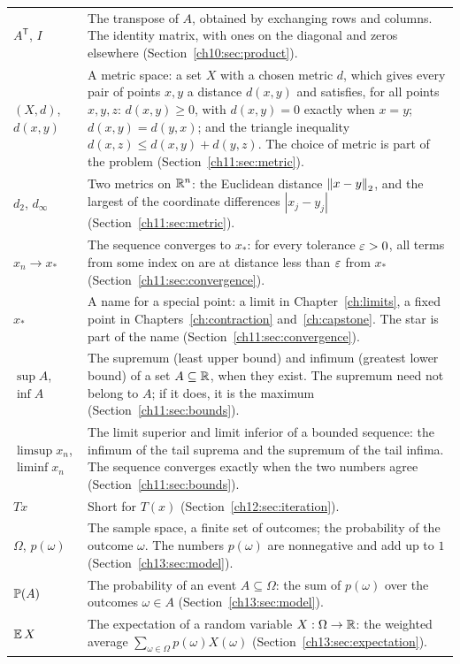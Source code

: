 \begin{longtable}{@{}p{1.25in}p{3.95in}@{}}
$A^{\mathsf T}$, $I$ & The transpose of $A$, obtained by exchanging rows and columns. The identity matrix, with ones on the diagonal and zeros elsewhere (Section~\ref{ch10:sec:product}).\\
$(X,d)$, $d(x,y)$ & A metric space: a set $X$ with a chosen metric $d$, which gives every pair of points $x,y$ a distance $d(x,y)$ and satisfies, for all points $x,y,z$: $d(x,y)\ge0$, with $d(x,y)=0$ exactly when $x=y$; $d(x,y)=d(y,x)$; and the triangle inequality $d(x,z)\le d(x,y)+d(y,z)$. The choice of metric is part of the problem (Section~\ref{ch11:sec:metric}).\\
$d_2$, $d_\infty$ & Two metrics on $\mathbb R^n$: the Euclidean distance $\left\|x-y\right\|_2$, and the largest of the coordinate differences $|x_j-y_j|$ (Section~\ref{ch11:sec:metric}).\\
$x_n\to x_*$ & The sequence converges to $x_*$: for every tolerance $\varepsilon>0$, all terms from some index on are at distance less than $\varepsilon$ from $x_*$ (Section~\ref{ch11:sec:convergence}).\\
$x_*$ & A name for a special point: a limit in Chapter~\ref{ch:limits}, a fixed point in Chapters~\ref{ch:contraction} and~\ref{ch:capstone}. The star is part of the name (Section~\ref{ch11:sec:convergence}).\\
$\sup A$, $\inf A$ & The supremum (least upper bound) and infimum (greatest lower bound) of a set $A\subseteq\mathbb R$, when they exist. The supremum need not belong to $A$; if it does, it is the maximum (Section~\ref{ch11:sec:bounds}).\\
$\limsup x_n$, $\liminf x_n$ & The limit superior and limit inferior of a bounded sequence: the infimum of the tail suprema and the supremum of the tail infima. The sequence converges exactly when the two numbers agree (Section~\ref{ch11:sec:bounds}).\\
$Tx$ & Short for $T(x)$ (Section~\ref{ch12:sec:iteration}).\\
$\Omega$, $p(\omega)$ & The sample space, a finite set of outcomes; the probability of the outcome $\omega$. The numbers $p(\omega)$ are nonnegative and add up to $1$ (Section~\ref{ch13:sec:model}).\\
$\operatorname{\mathbb P}(A)$ & The probability of an event $A\subseteq\Omega$: the sum of $p(\omega)$ over the outcomes $\omega\in A$ (Section~\ref{ch13:sec:model}).\\
$\operatorname{\mathbb E} X$ & The expectation of a random variable $X:\Omega\to\mathbb R$: the weighted average $\sum_{\omega\in\Omega}p(\omega)X(\omega)$ (Section~\ref{ch13:sec:expectation}).\\

\end{longtable}
